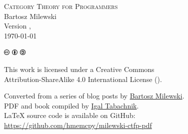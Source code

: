 

\vspace*{0.3\textheight}
\thispagestyle{empty}

\begin{small}
\begin{center}

\textsc{Category Theory for Programmers}\\

\vspace{1.0em}
\noindent
Bartosz Milewski\\

\vspace{1.26em}
\noindent
Version \texttt{\OPTVersion},\\\today


\vspace{1.6em}
\noindent
\includegraphics[width=3mm]{fig/icons/cc.pdf}
\includegraphics[width=3mm]{fig/icons/by.pdf}
\includegraphics[width=3mm]{fig/icons/sa.pdf}

\vspace{0.4em}
\noindent
This work is licensed under a Creative Commons\\
Attribution-ShareAlike 4.0 International License
(\href{http://creativecommons.org/licenses/by-sa/4.0/}{}).

\vspace{1.26em}
\noindent
Converted from a series of blog posts by \href{https://bartoszmilewski.com/2014/10/28/category-theory-for-programmers-the-preface/}{Bartosz Milewski}.\\
PDF and book compiled by \href{https://hmemcpy.com}{Igal Tabachnik}.\\
\vspace{1.26em}
\noindent
\LaTeX{} source code is available on GitHub: \href{https://github.com/hmemcpy/milewski-ctfp-pdf}{https://github.com/hmemcpy/milewski-ctfp-pdf} 
\end{center}
\end{small}